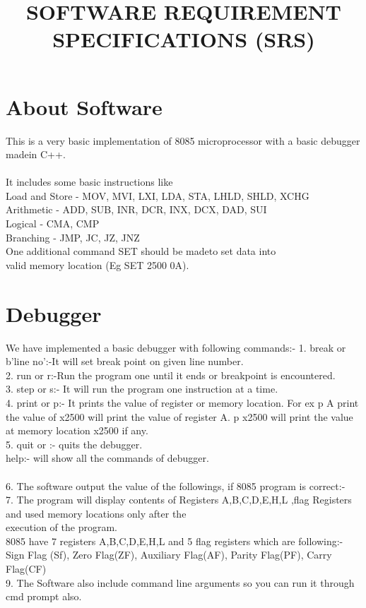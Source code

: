 \documentclass[12pt]{article}
\begin{document}
	\title{SOFTWARE REQUIREMENT SPECIFICATIONS (SRS)}
	\maketitle
	\section{About Software}
	This is a very basic implementation of 8085 microprocessor with a basic debugger madein C++.\\
	\\ 
	It includes some basic instructions like\\ 
	Load and Store - MOV, MVI, LXI, LDA, STA, LHLD, SHLD, XCHG\\
	Arithmetic - ADD, SUB, INR, DCR, INX, DCX, DAD, SUI\\
	Logical - CMA, CMP\\
	Branching - JMP, JC, JZ, JNZ\\
	One additional command SET should be madeto set data into\\ valid memory location (Eg SET 2500 0A).
	\section{Debugger}
	We have implemented a basic debugger with following commands:-
	1. break or b'line no':-It will set break point on given line number.\\
	2. run or r:-Run the program one until it ends or breakpoint is encountered.\\
	3. step or s:- It will run the program one instruction at a time.\\
	4. print or p:- It prints the value of register or memory location. For ex p A print the value of  x2500 will print the value of register A. p x2500 will print the value at memory location x2500 if any.\\
	5. quit or :- quits the debugger.\\
	help:- will show all the commands of debugger. \\
	\\
	6. The software output the value of the followings, if 8085 program is correct:-\\
	7. The program will display contents of Registers A,B,C,D,E,H,L ,flag Registers and used  memory locations only after the\\ execution of the program.\\
	8085 have 7 registers A,B,C,D,E,H,L and 5 flag registers which are following:-\\
	Sign Flag (Sf), Zero Flag(ZF), Auxiliary Flag(AF), Parity Flag(PF), Carry Flag(CF)\\
	9. The Software also include command line arguments so you can run it through cmd prompt also.\\
	
\end{document}
